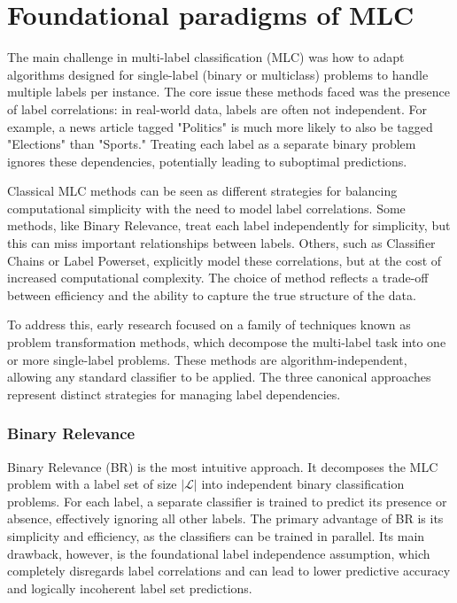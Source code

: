 \chapter{Foundational paradigms of MLC}
The main challenge in multi-label classification (MLC) was how to adapt algorithms designed for single-label (binary or multiclass) problems to handle multiple labels per instance. The core issue these methods faced was the presence of label correlations: in real-world data, labels are often not independent. For example, a news article tagged "Politics" is much more likely to also be tagged "Elections" than "Sports." Treating each label as a separate binary problem ignores these dependencies, potentially leading to suboptimal predictions.

Classical MLC methods can be seen as different strategies for balancing computational simplicity with the need to model label correlations. Some methods, like Binary Relevance, treat each label independently for simplicity, but this can miss important relationships between labels. Others, such as Classifier Chains or Label Powerset, explicitly model these correlations, but at the cost of increased computational complexity. The choice of method reflects a trade-off between efficiency and the ability to capture the true structure of the data.

To address this, early research focused on a family of techniques known as problem transformation methods, which decompose the multi-label task into one or more single-label problems. These methods are algorithm-independent, allowing any standard classifier to be applied. The three canonical approaches represent distinct strategies for managing label dependencies.

\subsection{Binary Relevance}
Binary Relevance (BR) is the most intuitive approach. It decomposes the MLC problem with a label set of size $|\mathcal{L}|$ into independent binary classification problems. For each label, a separate classifier is trained to predict its presence or absence, effectively ignoring all other labels. \cite{zhang_binary_2018} The primary advantage of BR is its simplicity and efficiency, as the classifiers can be trained in parallel. Its main drawback, however, is the foundational label independence assumption, which completely disregards label correlations and can lead to lower predictive accuracy and logically incoherent label set predictions. \cite{Sucar2014Multi-label}

